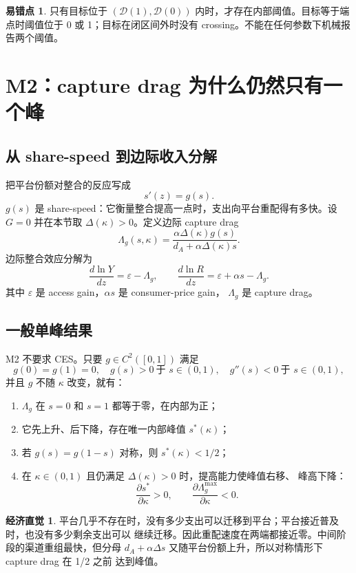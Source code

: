\documentclass[UTF8,11pt,scheme=chinese,fontset=fandol]{ctexart}
\newcommand{\calD}{\mathcal D}
\theoremstyle{definition}
\newtheorem{intuition}{经济直觉}[section]
\newtheorem{commonerror}{易错点}[section]
\begin{document}
\begin{commonerror}
只有目标位于 \((\calD(1),\calD(0))\) 内时，才存在内部阈值。目标等于端点时阈值位于
0 或 1；目标在闭区间外时没有 crossing。不能在任何参数下机械报告两个阈值。
\end{commonerror}

\section{M2：capture drag 为什么仍然只有一个峰}

\subsection{从 share-speed 到边际收入分解}

把平台份额对整合的反应写成
\[
s'(z)=g(s).
\]
\(g(s)\) 是 share-speed：它衡量整合提高一点时，支出向平台重配得有多快。设
\(G=0\) 并在本节取 \(\Delta(\kappa)>0\)。定义边际 capture drag
\[
\boxed{
\Lambda_g(s,\kappa)=
\frac{\alpha\Delta(\kappa)g(s)}
{d_A+\alpha\Delta(\kappa)s}.}
\]
边际整合效应分解为
\[
\boxed{
\frac{d\ln Y}{dz}=\varepsilon-\Lambda_g,
\qquad
\frac{d\ln R}{dz}=\varepsilon+\alpha s-\Lambda_g.}
\]
其中 \(\varepsilon\) 是 access gain，\(\alpha s\) 是 consumer-price gain，
\(\Lambda_g\) 是 capture drag。

\subsection{一般单峰结果}

M2 不要求 CES。只要 \(g\in C^2([0,1])\) 满足
\[
g(0)=g(1)=0,
\quad g(s)>0\ \text{于 }s\in(0,1),
\quad g''(s)<0\ \text{于 }s\in(0,1),
\]
并且 \(g\) 不随 \(\kappa\) 改变，就有：
\begin{enumerate}
  \item \(\Lambda_g\) 在 \(s=0\) 和 \(s=1\) 都等于零，在内部为正；
  \item 它先上升、后下降，存在唯一内部峰值 \(s^*(\kappa)\)；
  \item 若 \(g(s)=g(1-s)\) 对称，则 \(s^*(\kappa)<1/2\)；
  \item 在 \(\kappa\in(0,1)\) 且仍满足 \(\Delta(\kappa)>0\) 时，提高能力使峰值右移、
  峰高下降：
  \[
  \frac{\partial s^*}{\partial\kappa}>0,
  \qquad
  \frac{\partial\Lambda_g^{\max}}{\partial\kappa}<0.
  \]
\end{enumerate}

\begin{intuition}
平台几乎不存在时，没有多少支出可以迁移到平台；平台接近普及时，也没有多少剩余支出可以
继续迁移。因此重配速度在两端都接近零。中间阶段的渠道重组最快，但分母
\(d_A+\alpha\Delta s\) 又随平台份额上升，所以对称情形下 capture drag 在 1/2 之前
达到峰值。
\end{intuition}
\end{document}
